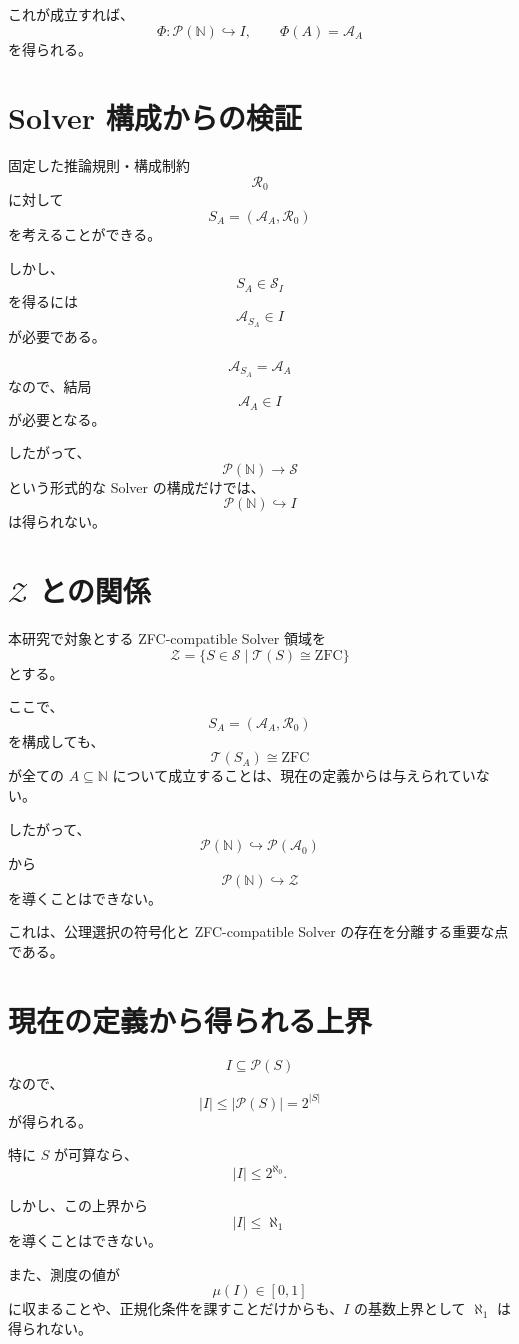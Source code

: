 \documentclass[a4paper,11pt]{article}
\newcommand{\Solver}{\mathcal{S}}
\begin{document}
これが成立すれば、
\[
\Phi:
\mathcal{P}(\mathbb{N})\hookrightarrow I,
\qquad
\Phi(A)=\mathcal{A}_A
\]
を得られる。

\section{Solver 構成からの検証}

固定した推論規則・構成制約
\[
\mathcal{R}_0
\]
に対して
\[
S_A=(\mathcal{A}_A,\mathcal{R}_0)
\]
を考えることができる。

しかし、
\[
S_A\in\mathcal{S}_I
\]
を得るには
\[
\mathcal{A}_{S_A}\in I
\]
が必要である。

\[
\mathcal{A}_{S_A}=\mathcal{A}_A
\]
なので、結局
\[
\mathcal{A}_A\in I
\]
が必要となる。

したがって、
\[
\mathcal{P}(\mathbb{N})\to\Solver
\]
という形式的な Solver の構成だけでは、
\[
\mathcal{P}(\mathbb{N})\hookrightarrow I
\]
は得られない。

\section{$\mathcal{Z}$ との関係}

本研究で対象とする ZFC-compatible Solver 領域を
\[
\mathcal{Z}
=
\{S\in\Solver\mid\mathcal{T}(S)\cong\mathrm{ZFC}\}
\]
とする。

ここで、
\[
S_A=(\mathcal{A}_A,\mathcal{R}_0)
\]
を構成しても、
\[
\mathcal{T}(S_A)\cong\mathrm{ZFC}
\]
が全ての $A\subseteq\mathbb{N}$ について成立することは、現在の定義からは与えられていない。

したがって、
\[
\mathcal{P}(\mathbb{N})
\hookrightarrow
\mathcal{P}(\mathcal{A}_0)
\]
から
\[
\mathcal{P}(\mathbb{N})
\hookrightarrow
\mathcal{Z}
\]
を導くことはできない。

これは、公理選択の符号化と ZFC-compatible Solver の存在を分離する重要な点である。

\section{現在の定義から得られる上界}

\[
I\subseteq\mathcal{P}(S)
\]
なので、
\[
|I|
\leq
|\mathcal{P}(S)|
=
2^{|S|}
\]
が得られる。

特に $S$ が可算なら、
\[
|I|\leq2^{\aleph_0}.
\]

しかし、この上界から
\[
|I|\leq\aleph_1
\]
を導くことはできない。

また、測度の値が
\[
\mu(I)\in[0,1]
\]
に収まることや、正規化条件を課すことだけからも、$I$ の基数上界として $\aleph_1$ は得られない。
\end{document}
